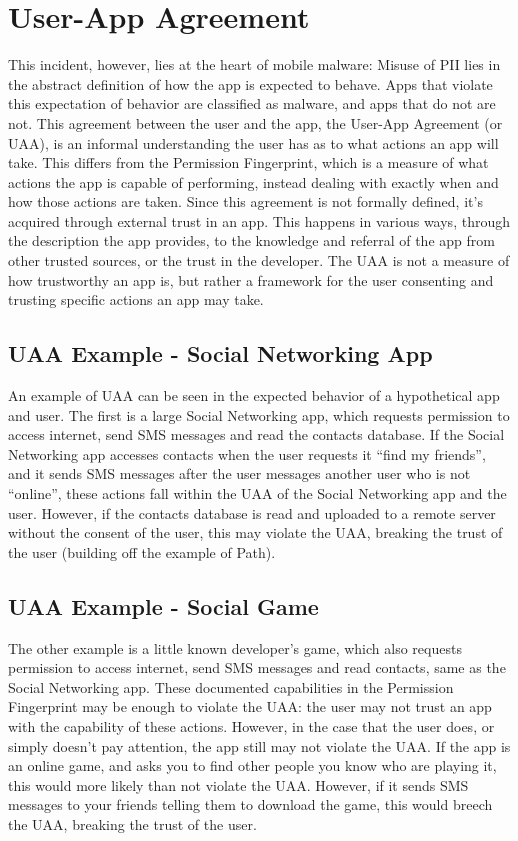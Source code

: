 \section{User-App Agreement}
This incident, however, lies at the heart of mobile malware: Misuse of PII lies in the abstract definition of how the app is expected to behave. Apps that violate this expectation of behavior are classified as malware, and apps that do not are not. This agreement between the user and the app, the User-App Agreement (or UAA), is an informal understanding the user has as to what actions an app will take. This differs from the Permission Fingerprint, which is a measure of what actions the app is capable of performing, instead dealing with exactly when and how those actions are taken. Since this agreement is not formally defined, it's acquired through external trust in an app. This happens in various ways, through the description the app provides, to the knowledge and referral of the app from other trusted sources, or the trust in the developer. The UAA is not a measure of how trustworthy an app is, but rather a framework for the user consenting and trusting specific actions an app may take.

\subsection{UAA Example - Social Networking App}
An example of UAA can be seen in the expected behavior of a hypothetical app and user. The first is a large Social Networking app, which requests permission to access internet, send SMS messages and read the contacts database. If the Social Networking app accesses contacts when the user requests it ``find my friends'', and it sends SMS messages after the user messages another user who is not ``online'', these actions fall within the UAA of the Social Networking app and the user. However, if the contacts database is read and uploaded to a remote server without the consent of the user, this may violate the UAA, breaking the trust of the user (building off the example of Path). 

\subsection{UAA Example - Social Game}
The other example is a little known developer's game, which also requests permission to access internet, send SMS messages and read contacts, same as the Social Networking app. These documented capabilities in the Permission Fingerprint may be enough to violate the UAA: the user may not trust an app with the capability of these actions. However, in the case that the user does, or simply doesn't pay attention, the app still may not violate the UAA. If the app is an online game, and asks you to find other people you know who are playing it, this would more likely than not violate the UAA. However, if it sends SMS messages to your friends telling them to download the game, this would breech the UAA, breaking the trust of the user.


